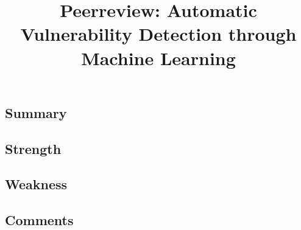 \documentclass[peerreview, 10pt, onecolumn]{IEEEtran}
\begin{document}
\title{Peerreview: Automatic Vulnerability Detection through Machine Learning}

\author{}

\IEEEpeerreviewmaketitle

\subsection*{Summary}

\subsection*{Strength}

\subsection*{Weakness}

\subsection*{Comments}
\end{document}
